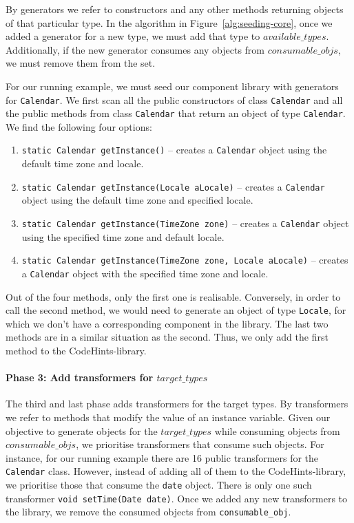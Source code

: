 \documentclass[sigconf,review,anonymous]{acmart}
\begin{document}
By generators we refer to constructors and any other methods returning objects of that particular type.
In the algorithm in Figure~\ref{alg:seeding-core},
once we added a generator for a new type, we must add that type to $available\_types$.
Additionally, if the new generator consumes any objects from $consumable\_objs$,
we must remove them from the set.

For our running example, we must seed our component library with generators for \texttt{Calendar}.
%
We first scan all the public constructors of class \texttt{Calendar}
and all the public methods from class \texttt{Calendar} that return an object of type \texttt{Calendar}. We find the following four options:

\begin{enumerate}
  \item \texttt{static Calendar	getInstance()} -- creates a \texttt{Calendar} object using the default time zone and locale.
  \item \texttt{static Calendar getInstance(Locale aLocale)} -- creates a \texttt{Calendar} object using the default time zone and specified locale.
  \item \texttt{static Calendar	getInstance(TimeZone zone)} -- creates a \texttt{Calendar} object using the specified time zone and default locale.
  \item \texttt{static Calendar	getInstance(TimeZone zone, Locale aLocale)} -- creates a \texttt{Calendar} object with the specified time zone and locale.
\end{enumerate}

Out of the four methods,
only the first one is realisable. Conversely, in order to call the second method, we would need to generate an object of type \texttt{Locale},
for which we don't have a corresponding component in the library.
The last two methods are in a similar situation as the second. Thus, we only add the first method to the CodeHints-library.

\paragraph{{\bf Phase 3: Add transformers for $target\_types$}}
The third and last phase adds  transformers for the target types.
By transformers we refer to methods that modify the value of an instance variable.
Given our objective to generate objects for the $target\_types$ while consuming objects from $consumable\_objs$,
we prioritise transformers that consume such objects.
For instance, for our running example there are 16 public transformers for the \texttt{Calendar} class.
However, instead of adding all of them to the CodeHints-library, we prioritise those that
consume the \texttt{date} object. There is only one such transformer \texttt{void setTime(Date date)}.
Once we added any new transformers to the library, we remove the consumed objects from \texttt{consumable\_obj}.
\end{document}
